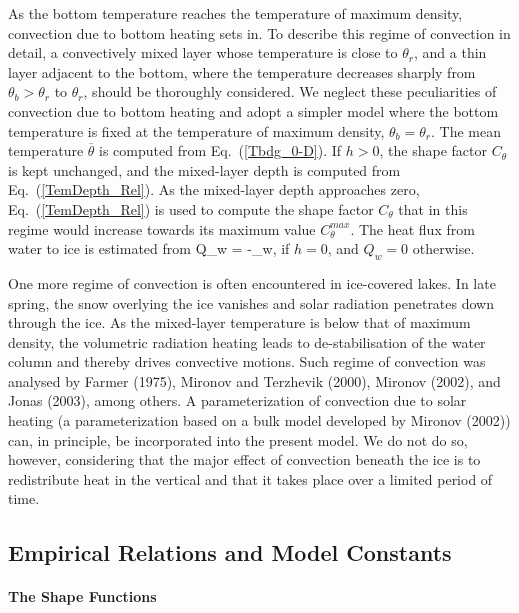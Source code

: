 As the bottom temperature reaches the temperature of maximum density,
convection due to bottom heating sets in. To describe this regime of convection 
in detail, a convectively mixed layer whose temperature is close to $\theta_r$, 
and a thin layer adjacent to the bottom,
where the temperature decreases sharply from $\theta_b>\theta_r$ to $\theta_r$, 
should be thoroughly considered. 
We neglect these peculiarities of convection due to bottom heating 
and adopt a simpler model where the bottom temperature is fixed 
at the temperature of maximum density, $\theta_b=\theta_r$.
The mean temperature $\overline{\theta}$ is computed from Eq.~(\ref{Tbdg_0-D}).
If $h>0$, the shape factor $C_{\theta}$ is kept unchanged, 
and the mixed-layer depth is computed from Eq.~(\ref{TemDepth_Rel}).
As the mixed-layer depth approaches zero,
Eq.~(\ref{TemDepth_Rel}) is used to compute the shape factor $C_{\theta}$
that in this regime would increase towards its maximum value $C_{\theta}^{max}$.
The heat flux from water to ice is estimated from
%
\beq\label{HFlux_water_ice_Phi}
Q_w = -{\kappa_w}\max{} ,
\eeq
%
if $h=0$, and $Q_w=0$ otherwise.

One more regime of convection is often encountered in ice-covered lakes.
In late spring, the snow overlying the ice vanishes and
solar radiation penetrates down through the ice.
As the mixed-layer temperature is below that of maximum density,
the volumetric radiation heating leads to de-stabilisation of
the water column and thereby drives convective motions.
Such regime of convection was analysed by 
Farmer (1975), Mironov and Terzhevik (2000), Mironov \etal (2002), 
and Jonas \etal (2003), among others.
A parameterization of convection due to solar heating 
(\eg a parameterization based on a bulk model developed by Mironov \etal (2002)) 
can, in principle, be incorporated into the present model.
We do not do so, however,
considering that the major effect of convection beneath the ice is to 
redistribute heat in the vertical and that it takes place over a 
limited period of time. 


\subsection{Empirical Relations and Model Constants}\label{constempirrel}
\nopagebreak 
%
\paragraph{The Shape Functions}\label{empir_shapefun}
\nopagebreak 
%
\noindent

